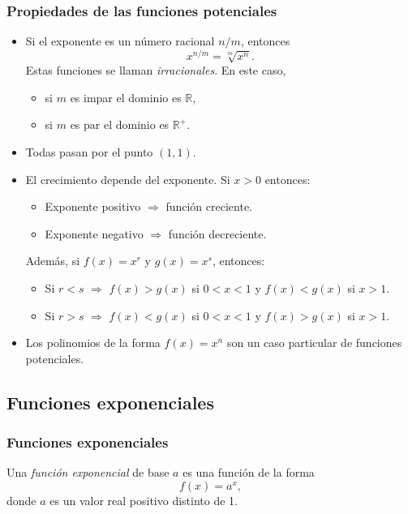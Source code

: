 	
	\begin{frame}
		\frametitle{Propiedades de las funciones potenciales}
		\begin{itemize}
			\item Si el exponente es un número racional $n/m$, entonces 
			      \[x^{n/m}=\sqrt[m]{x^n}.\]
			      Estas funciones se llaman \emph{irracionales}. En este caso, 
			      \begin{itemize}
			      	\item si $m$ es impar el dominio es $\mathbb{R}$,
			      	\item si $m$ es par el dominio es $\mathbb{R}^+$.
			      \end{itemize}
			\item Todas pasan por el punto $(1,1)$.
			\item El crecimiento depende del exponente. Si $x>0$ entonces:
			      \begin{itemize}
			      	\item Exponente positivo $\Rightarrow$ función creciente.
			      	\item Exponente negativo $\Rightarrow$ función decreciente. 
			      \end{itemize}
			      Además, si $f(x)=x^r$ y $g(x)=x^s$, entonces:
			      \begin{itemize}
			      	\item Si $r<s$ $\Rightarrow$ $f(x)>g(x)$ si $0<x<1$ y $f(x)<g(x)$ si $x>1$.
			      	\item Si $r>s$ $\Rightarrow$ $f(x)<g(x)$ si $0<x<1$ y $f(x)>g(x)$ si $x>1$.
			      \end{itemize}
			      
			\item Los polinomios de la forma $f(x)=x^n$ son un caso particular de funciones potenciales. 
		\end{itemize}
	\end{frame} 
	
	
	
	\subsection{Funciones exponenciales}
	\begin{frame}
		\frametitle{Funciones exponenciales}
		\begin{definicion}
			Una \emph{función exponencial} de base $a$ es una función de la forma
			\[
				f(x)=a^x,
			\]
			donde $a$ es un valor real positivo distinto de 1.
		\end{definicion}
		\begin{center}
			\scalebox{1}{}
		\end{center}
	\end{frame} 
	
